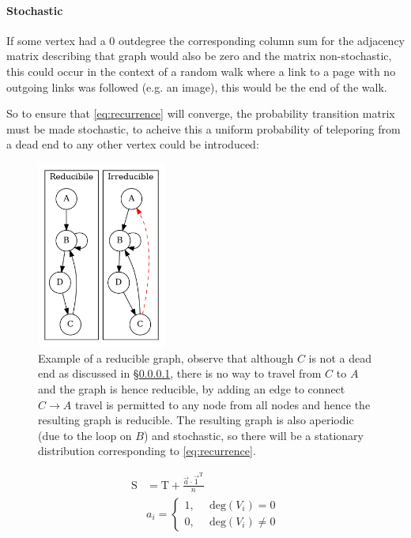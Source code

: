 \documentclass[11pt]{report}
\begin{document}
\paragraph{Stochastic}
\label{stochastic}
If some vertex had a 0 outdegree the corresponding column sum for the adjacency
matrix describing that graph would also be zero and the matrix non-stochastic,
this could occur in the context of a random walk where a link to a page with no
outgoing links was followed (e.g. an image), this would be the end of the
walk.

So to ensure that \eqref{eq:recurrence} will converge, the probability transition
matrix must be made stochastic, to acheive this a uniform probability of teleporing from a dead end to any other vertex could be introduced:


 \begin{figure}
     \includegraphics[width=0.38\textwidth]{media/dot/reducible_graph_example.dot.png}
     \caption{\label{irreducible-example}Example of a reducible graph, observe that although \(C\) is not a dead end as discussed in \S \ref{stochastic}, there is no way to travel from \(C\) to \(A\) and the graph is hence reducible, by adding an edge to connect \(C\rightarrow A\) travel is permitted to any node from all nodes and hence the resulting graph is reducible. The resulting graph is also aperiodic (due to the loop on \(B\)) and stochastic, so there will be a stationary distribution corresponding to \eqref{eq:recurrence}.}
 \end{figure}

\begin{align}
\mathrm{S} &= \mathrm{T}+ \frac{\vec{a} \cdot \vec{1}^{\mathrm{T}} }{n} \label{eq:nearly-random-surfer} \\
& a_{i} = \begin{cases}
    1      , &\enspace \mathrm{deg}\left( V_{i}\right) = 0  \\
    0      , &\enspace \mathrm{deg}\left( V_{i}\right) \neq 0
\end{cases}
\end{align}
\end{document}
